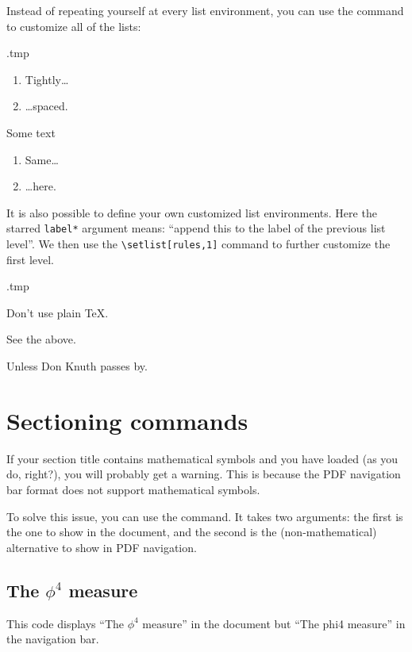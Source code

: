 Instead of repeating yourself at every list environment,
you can use the  command to customize all of the lists:
%
\begin{VerbatimOut}{\jobname.tmp}

\begin{enumerate}
\item Tightly\dots
\item \dots{}spaced.
\end{enumerate}

Some text

\begin{enumerate}
\item Same\dots
\item \dots{}here.
\end{enumerate}
\end{VerbatimOut}
\ShowExample

It is also possible to define your own customized list environments.
Here the starred \verb|label*| argument means: ``append this to the label of the previous list level''.
We then use the \verb|\setlist[rules,1]| command to further customize the first level.
\begin{VerbatimOut}{\jobname.tmp}

\begin{rules}
\item Don't use plain \TeX.
\item See the above.
\begin{rules}
\item Unless Don Knuth passes by.
\end{rules}
\end{rules}
\end{VerbatimOut}
\ShowExample


%
%
%
\section{Sectioning commands}

\begin{gotcha}
If your section title contains mathematical symbols
and you have  loaded (as you do, right?),
you will probably get a warning.
This is because the PDF navigation bar format does not support mathematical symbols.

To solve this issue, you can use the  command.
It takes two arguments: the first is the one to show in the document,
and the second is the (non-mathematical) alternative to show in PDF navigation.
\begin{ExampleCode}
\section{The \texorpdfstring{$\phi^4$}{phi4} measure}
\end{ExampleCode}
This code displays ``The $\phi^4$ measure'' in the document
but ``The phi4 measure'' in the navigation bar.
\end{gotcha}

